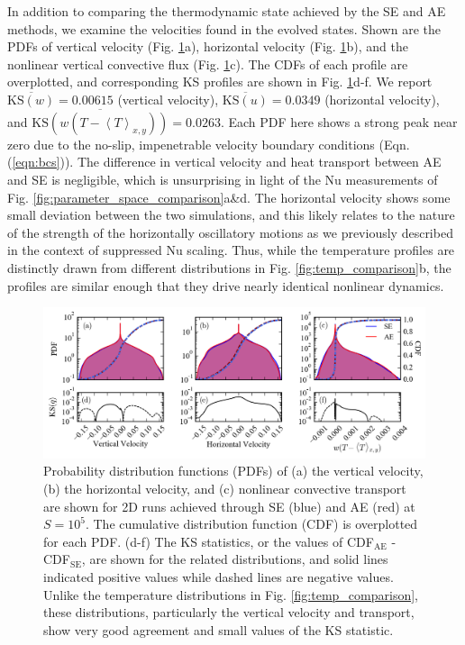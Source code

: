 \documentclass[aps, pre, onecolumn, nofootinbib, notitlepage, groupedaddress, amsfonts, amssymb, amsmath, longbibliography]{revtex4-1}
\newcommand{\angles}[1]{\ensuremath{\left\langle #1 \right\rangle}}
\newcommand{\KSstat}[1]{\ensuremath{\overline{\text{KS}(#1)}}}
\begin{document}
In addition to comparing the thermodynamic state achieved by the SE and AE methods,
we examine the velocities found in the evolved states.
Shown are the PDFs of 
vertical velocity (Fig. \ref{fig:pdf_comparison}a), horizontal velocity (Fig. \ref{fig:pdf_comparison}b),
and the nonlinear vertical convective flux (Fig. \ref{fig:pdf_comparison}c). 
The CDFs of each profile are overplotted, and corresponding KS profiles are
shown in Fig. \ref{fig:pdf_comparison}d-f.  We report
$\KSstat{w} = 0.00615$ (vertical velocity), $\KSstat{u} = 0.0349$ (horizontal velocity),
and $\KSstat{w(T - \angles{T}_{x,y})} = 0.0263$.
Each PDF here shows a strong peak near zero due to the no-slip, impenetrable
velocity boundary conditions (Eqn. (\ref{eqn:bcs})).
The difference in vertical velocity
and heat transport between AE and SE is negligible, which is unsurprising in light of
the Nu measurements of Fig. \ref{fig:parameter_space_comparison}a\&d.
The horizontal velocity shows some small deviation between the two simulations, and this
likely relates to the nature of the strength of the horizontally oscillatory motions
as we previously described in the context of suppressed Nu scaling. Thus, while
the temperature profiles are distinctly drawn from different distributions in
Fig. \ref{fig:temp_comparison}b, the profiles are similar enough that they drive
nearly identical nonlinear dynamics.


\begin{figure}[t]
\includegraphics[width=\textwidth]{./figs/pdf_comparison.png}
\caption{Probability distribution functions (PDFs) of (a) the vertical velocity, (b) the horizontal velocity, and (c) nonlinear
convective transport are shown for 2D runs achieved through SE (blue) and AE (red)
at $S = 10^{5}$.  The cumulative distribution function (CDF) is overplotted for each PDF. 
(d-f) The KS statistics, or the values of CDF$_{\text{AE}}$ - CDF$_{\text{SE}}$,
are shown for the related distributions, and solid lines indicated positive values
while dashed lines are negative values. Unlike the temperature distributions in
Fig. \ref{fig:temp_comparison}, these distributions, particularly the vertical
velocity and transport, show very good agreement and small values of the KS statistic.
\label{fig:pdf_comparison} }
\end{figure}
\end{document}
